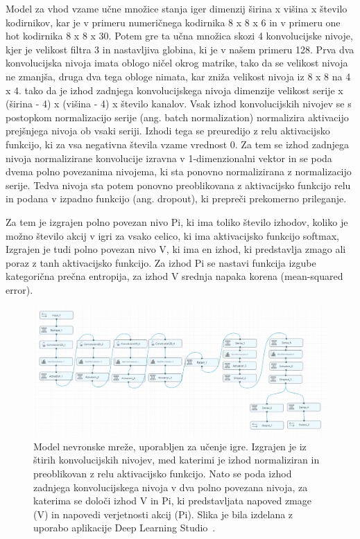\documentclass[a4paper, 12pt]{book}
\begin{document}
Model za vhod vzame učne množice stanja iger dimenzij širina x višina x število kodirnikov, kar je v primeru numeričnega kodirnika 8 x 8 x 6 in v primeru one hot kodirnika 8 x 8 x 30.
Potem gre ta učna množica skozi 4 konvolucijske nivoje, kjer je velikost filtra 3 in nastavljiva globina, ki je v našem primeru 128.
Prva dva konvolucijska nivoja imata oblogo ničel okrog matrike, tako da se velikost nivoja ne zmanjša, druga dva tega obloge nimata, kar zniža velikost nivoja iz 8 x 8 na 4 x 4.
tako da je izhod zadnjega konvolucijskega nivoja dimenzije velikost serije x (širina - 4) x (višina - 4) x število kanalov.
Vsak izhod konvolucijskih nivojev se s postopkom normalizacijo serije (ang. batch normalization) normalizira aktivacijo prejšnjega nivoja ob vsaki seriji.
Izhodi tega se preuredijo z relu aktivacijsko funkcijo, ki za vsa negativna števila vzame vrednost 0.
Za tem se izhod zadnjega nivoja normalizirane konvolucije izravna v 1-dimenzionalni vektor in se poda dvema polno povezanima nivojema, ki sta ponovno normalizirana z normalizacijo serije.
Tedva nivoja sta potem ponovno preoblikovana z aktivacijsko funkcijo relu in podana v izpadno funkcijo (ang. dropout), ki prepreči prekomerno prileganje.

Za tem je izgrajen polno povezan nivo Pi, ki ima toliko število izhodov, koliko je možno število akcij v igri za vsako celico, ki ima aktivacijsko funkcijo softmax,
Izgrajen je tudi polno povezan nivo V, ki ima en izhod, ki predstavlja zmago ali poraz z tanh aktivacijsko funkcijo.
Za izhod Pi se nastavi funkcija izgube kategorična prečna entropija, za izhod V srednja napaka korena (mean-squared error).

\begin{figure}[h!]
	\begin{center}
		\includegraphics[width=1\textwidth]{photos/model_using_deepcognition.pdf}
	\end{center}
	\caption{Model nevronske mreže, uporabljen za učenje igre. Izgrajen je iz štirih konvolucijskih nivojev, med katerimi je izhod normaliziran in preoblikovan z relu aktivacijsko funkcijo. 
		Nato se poda izhod zadnjega konvolucijskega nivoja v dva polno povezana nivoja, za katerima se določi izhod V in Pi, ki predstavljata napoved zmage (V) in napovedi verjetnosti akcij (Pi).
		Slika je bila izdelana z uporabo aplikacije Deep Learning Studio~\cite{deepcognition}.}
	\label{vizualzacijaModela}
\end{figure}
\end{document}
